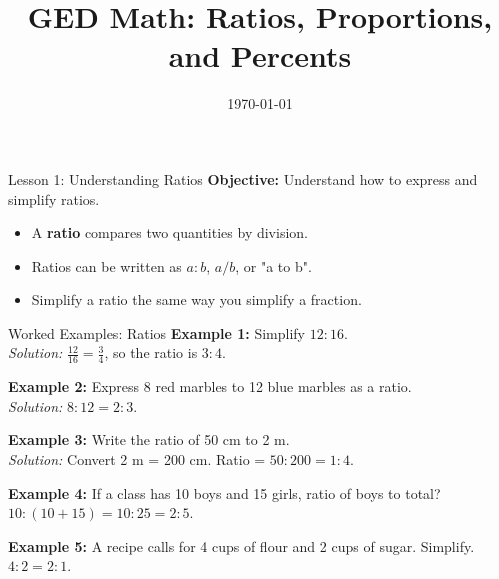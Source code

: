 \documentclass{beamer}
\title{GED Math: Ratios, Proportions, and Percents}
\date{\today}
\begin{document}
\frame{\titlepage}

\begin{frame}{Lesson 1: Understanding Ratios}
\textbf{Objective:} Understand how to express and simplify ratios.
\begin{itemize}
    \item A \textbf{ratio} compares two quantities by division.
    \item Ratios can be written as $a:b$, $a/b$, or "a to b".
    \item Simplify a ratio the same way you simplify a fraction.
\end{itemize}
\vspace{1em}
\begin{center}
\end{center}
\end{frame}

\begin{frame}{Worked Examples: Ratios}
\textbf{Example 1:} Simplify $12:16$.\\
\textit{Solution:} $\frac{12}{16} = \frac{3}{4}$, so the ratio is $3:4$.

\vspace{0.5em}
\textbf{Example 2:} Express 8 red marbles to 12 blue marbles as a ratio.\\
\textit{Solution:} $8:12 = 2:3$.

\vspace{0.5em}
\textbf{Example 3:} Write the ratio of 50 cm to 2 m.\\
\textit{Solution:} Convert 2 m = 200 cm. Ratio = $50:200 = 1:4$.

\vspace{0.5em}
\textbf{Example 4:} If a class has 10 boys and 15 girls, ratio of boys to total?\\
$10:(10+15)=10:25=2:5$.

\vspace{0.5em}
\textbf{Example 5:} A recipe calls for 4 cups of flour and 2 cups of sugar. Simplify.\\
$4:2=2:1$.
\end{frame}
\end{document}
